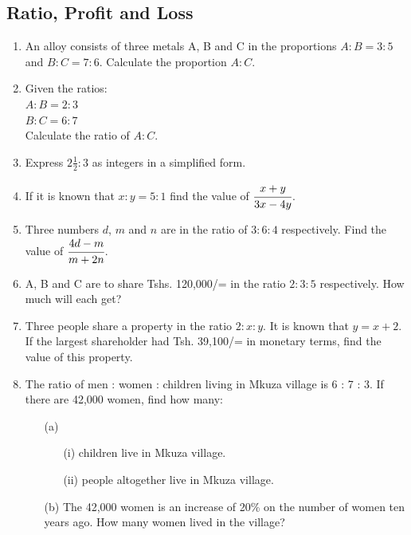 	\subsection{Ratio, Profit and Loss}
\begin{enumerate}

		\subsubsection{Ratio}
	\item An alloy consists of three metals A, B and C in the proportions $A:B = 3:5$ and $B:C = 7:6$. Calculate the proportion $A:C$.		
		
	\item Given the ratios:\\
	$A : B = 2 : 3$\\
	$B : C = 6 : 7$\\
	Calculate the ratio of $A : C$.
	
	\item Express $2\frac{1}{2} : 3$ as integers in a simplified form.
	
	\item If it is known that $x:y = 5:1$ find the value of $\cfrac{x + y}{3x - 4y}$.
	
	\item Three numbers $d$, $m$ and $n$ are in the ratio of $3:6:4$ respectively. Find the value of $\cfrac{4d - m}{m + 2n}$.
	
	\item A, B and C are to share Tshs. 120,000/= in the ratio $2:3:5$ respectively. How much will each get?
	
	\item Three people share a property in the ratio $2:x:y$. It is known that $y = x + 2$. If the largest shareholder had Tsh. 39,100/= in monetary terms, find the value of this property.
	
	\item The ratio of men : women : children living in Mkuza village is 6 : 7 : 3. If there are 42,000 women, find how many:
		\begin{itemize}
		\item[(a)]
			\begin{itemize}
			\item[(i)] children live in Mkuza village.
			\item[(ii)] people altogether live in Mkuza village.
			\end{itemize}
		\item[(b)] The 42,000 women is an increase of 20\% on the number of women ten years ago. How many women lived in the village?
		\end{itemize}
		

\end{enumerate}
